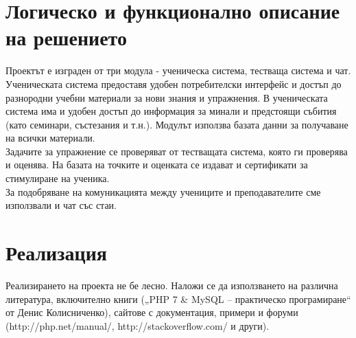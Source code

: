\documentclass[12pt]{article}
\begin{document}
	\section{Логическо и функционално описание на решението}
	Проектът е изграден от три модула -  ученическа система, тестваща система и чат. 
	Ученическата система предоставя удобен потребителски интерфейс и достъп до разнородни учебни материали за нови знания и упражнения. В ученическата система има и удобен достъп до информация за минали и предстоящи събития (като семинари, състезания и т.н.). Модулът използва базата данни за получаване на всички материали.\\
	Задачите за упражнение се проверяват от тестващата система, която ги проверява и оценява. На базата на точките и оценката се издават и сертификати за стимулиране на ученика. \\
	За подобряване на комуникацията между учениците и преподавателите сме използвали и чат със стаи.
	\section{Реализация}
	Реализирането на проекта не бе лесно. Наложи се да използването на различна литература, включително книги („PHP 7 \& MySQL – практическо програмиране“ от Денис Колисниченко), сайтове с документация, примери и форуми (http://php.net/manual/, http://stackoverflow.com/ и други).
\end{document}
